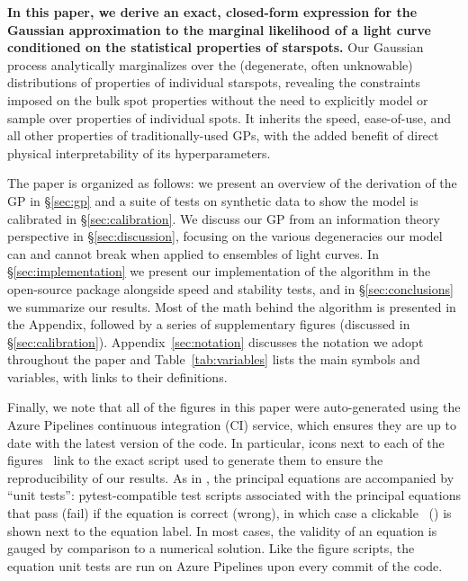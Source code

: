 \documentclass[modern]{aastex62}
\begin{document}
\textbf{In this paper, we derive an exact, closed-form expression for
    the Gaussian approximation to the marginal likelihood of a light curve
    conditioned on the statistical properties of starspots.} Our Gaussian
process analytically marginalizes over the (degenerate, often unknowable)
distributions of properties of individual starspots, revealing the
constraints imposed on the bulk spot properties without the need to
explicitly model or sample over properties of individual spots. It inherits
the speed, ease-of-use, and all other properties of traditionally-used
GPs, with the added benefit of direct physical interpretability of its
hyperparameters.
%

The paper is organized as follows:
we present an overview of the derivation of the GP in \S\ref{sec:gp}
and a suite of tests on synthetic data to show the model is calibrated
in \S\ref{sec:calibration}. We discuss our GP from an information
theory perspective in \S\ref{sec:discussion}, focusing on
the various degeneracies our model can and cannot break when applied
to ensembles of light curves. In \S\ref{sec:implementation} we present
our implementation of the algorithm in the open-source \starryprocess package
alongside speed and stability tests, and in \S\ref{sec:conclusions} we
summarize our results. Most of the math behind the algorithm
is presented in the Appendix, followed by a series of supplementary figures
(discussed in \S\ref{sec:calibration}). Appendix~\ref{sec:notation} discusses the
notation we adopt throughout the paper and Table~\ref{tab:variables}
lists the main symbols and variables, with links to their definitions.

Finally, we note that all of the figures in this paper were auto-generated
using the Azure Pipelines continuous integration (CI) service, which
ensures they are up to date with the latest version of the
\starryprocess code. In particular, icons next to each of the figures \codeicon \,
link to the exact script used to generate them to ensure the reproducibility
of our results. As in \citet{PaperI}, the principal equations are
accompanied by
``unit tests'': \textsf{pytest}-compatible test scripts associated
with the principal equations that pass (fail) if the equation is correct (wrong),
in which case a clickable \testpassicon \, (\testfailicon) is shown next to the equation
label.
In most cases, the validity of an equation is gauged by comparison to
a numerical solution. Like the figure scripts, the equation unit tests are
run on Azure Pipelines upon every commit of the code.
\end{document}
